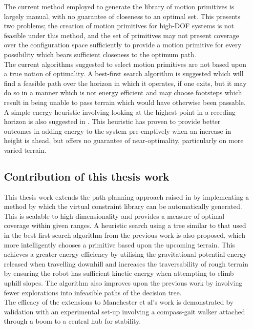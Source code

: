 The current method employed to generate the library of motion primitives is largely manual, with no guarantee of closeness to an optimal set. This presents two problems; the creation of motion primitives for high-DOF systems is not feasible under this method, and the set of primitives may not present coverage over the configuration space sufficiently to provide a motion primitive for every possibility which bears sufficient closeness to the optimum path. \\

The current algorithms suggested to select motion primitives are not based upon a true notion of optimality. A best-first search algorithm is suggested which will find a feasible path over the horizon in which it operates, if one exits, but it may do so in a manner which is not energy efficient and may choose footsteps which result in being unable to pass terrain which would have otherwise been passable. A simple energy heuristic involving looking at the highest point in a receding horizon is also suggested in \cite{manchester13planning}. This heuristic has proven to provide better outcomes in adding energy to the system pre-emptively when an increase in height is ahead, but offers no guarantee of near-optimality, particularly on more varied terrain. \\

\subsection{Contribution of this thesis work}
This thesis work extends the path planning approach raised in \cite{manchester13planning} by implementing a method by which the virtual constraint library can be automatically generated. This is scalable to high dimensionality and provides a measure of optimal coverage within given ranges. A heuristic search using a tree similar to that used in the best-first search algorithm from the previous work is also proposed, which more intelligently chooses a primitive based upon the upcoming terrain. This achieves a greater energy efficiency by utilising the gravitational potential energy released when travelling downhill and increases the traversability of rough terrain by ensuring the robot has sufficient kinetic energy when attempting to climb uphill slopes. The algorithm also improves upon the previous work by involving fewer explorations into infeasible paths of the decision tree. \\

The efficacy of the extensions to Manchester et al's work is demonstrated by validation with an experimental set-up involving a compass-gait walker attached through a boom to a central hub for stability.